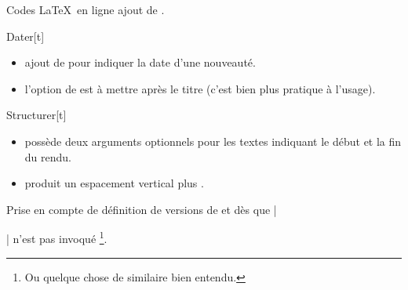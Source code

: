\begin{bdoctopic}{Codes \LaTeX\ en ligne}
    ajout de .
\end{bdoctopic}




\begin{bdoctopic}{Dater}[t]
    \begin{itemize}
        \item ajout de  pour indiquer la date d'une nouveauté.

        \item l'option de  est à mettre après le titre (c'est bien plus pratique à l'usage).
    \end{itemize}
\end{bdoctopic}




\begin{bdoctopic}{Structurer}[t]
    \begin{itemize}
        \item {} possède deux arguments optionnels pour les textes indiquant le début et la fin du rendu.

        \item {} produit un espacement vertical plus .
    \end{itemize}
\end{bdoctopic}




\begin{bdoctopic}{Prise en compte de }
    définition de versions  de  et  dès que \bdocinlatex|\usepackage[french]{babel}| n'est pas invoqué
    \footnote{
        Ou quelque chose de similaire bien entendu.
    }.
\end{bdoctopic}
